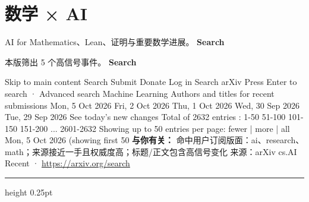 \documentclass[10.5pt]{ctexart}
\begin{document}
\section*{数学 × AI}
{\color{ormuted} AI for Mathematics、Lean、证明与重要数学进展。}
\vspace{2mm}
{\LARGE\bfseries Search}\par
\vspace{1mm}
{\color{ormuted} 本版筛出 5 个高信号事件。}
\vspace{3mm}
{\Large\bfseries Search}\par
Skip to main content Search Submit Donate Log in Search arXiv Press Enter to search · Advanced search Machine Learning Authors and titles for recent submissions Mon, 5 Oct 2026 Fri, 2 Oct 2026 Thu, 1 Oct 2026 Wed, 30 Sep 2026 Tue, 29 Sep 2026 See today's new changes Total of 2632 entries : 1-50 51-100 101-150 151-200 ... 2601-2632 Showing up to 50 entries per page: fewer | more | all Mon, 5 Oct 2026 (showing first 50
\textbf{与你有关：} 命中用户订阅版面：ai、research、math；来源接近一手且权威度高；标题/正文包含高信号变化
{\footnotesize\color{ormuted} 来源：arXiv cs.AI Recent · \url{https://arxiv.org/search}}
\vspace{4mm}
\hrule height 0.25pt
\vspace{3mm}
\end{document}
